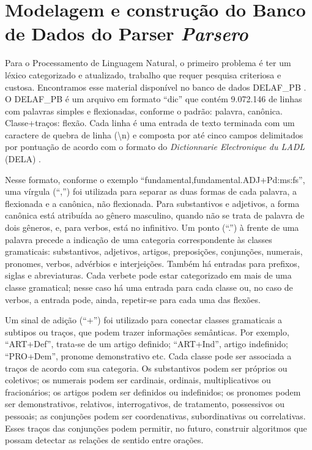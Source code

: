 \documentclass[portuguese]{textolivre}
\begin{document}
\section{Modelagem e construção do Banco de Dados do Parser \textit{Parsero}}\label{sec-fmt-manuscrito}
Para o Processamento de Linguagem Natural, o primeiro problema é ter um léxico categorizado e atualizado, trabalho que requer pesquisa criteriosa e custosa. Encontramos esse material disponível no banco de dados DELAF\_PB \cite{muniz_construcao_2004,muniz_delaf-pb:_2015}. O DELAF\_PB é um arquivo em formato “dic” que contém 9.072.146 de linhas com palavras simples e flexionadas, conforme o padrão: palavra, canônica. Classe+traços: flexão. Cada linha é uma entrada de texto terminada com um caractere de quebra de linha (\textbackslash n) e composta por até cinco campos delimitados por pontuação de acordo com o formato do \textit{Dictionnarie Electronique du LADL} (DELA) \cite[p. 17]{muniz_construcao_2004}.

Nesse formato, conforme o exemplo “fundamental,fundamental.ADJ+Pd:ms:fs”, uma vírgula (“,”) foi utilizada para separar as duas formas de cada palavra, a flexionada e a canônica, não flexionada. Para substantivos e adjetivos, a forma canônica está atribuída ao gênero masculino, quando não se trata de palavra de dois gêneros, e, para verbos, está no infinitivo. Um ponto (“.”) à frente de uma palavra precede a indicação de uma categoria correspondente às classes gramaticais: substantivos, adjetivos, artigos, preposições, conjunções, numerais, pronomes, verbos, advérbios e interjeições. Também há entradas para prefixos, siglas e abreviaturas. Cada verbete pode estar categorizado em mais de uma classe gramatical; nesse caso há uma entrada para cada classe ou, no caso de verbos, a entrada pode, ainda, repetir-se para cada uma das flexões.

Um sinal de adição (“+”) foi utilizado para conectar classes gramaticais a subtipos ou traços, que podem trazer informações semânticas. Por exemplo, “ART+Def”, trata-se de um artigo definido; “ART+Ind”, artigo indefinido; “PRO+Dem”, pronome demonstrativo etc. Cada classe pode ser associada a traços de acordo com sua categoria. Os substantivos podem ser próprios ou coletivos; os numerais podem ser cardinais, ordinais, multiplicativos ou fracionários; os artigos podem ser definidos ou indefinidos; os pronomes podem ser demonstrativos, relativos, interrogativos, de tratamento, possessivos ou pessoais; as conjunções podem ser coordenativas, subordinativas ou correlativas. Esses traços das conjunções podem permitir, no futuro, construir algoritmos que possam detectar as relações de sentido entre orações.
\end{document}
